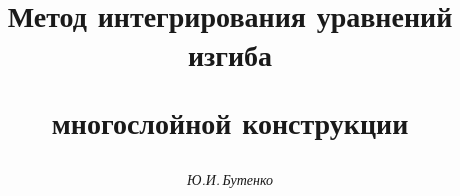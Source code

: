 

 


% 


\newcommand{\const}{\operatorname{const}} 


\newcommand{\tts}[1]{}  


 


 




\setcounter{page}{9} 












 


\author{\it Ю.И.\,Бутенко} 




\title{Метод интегрирования уравнений изгиба  


многослойной конструкции} 


 


\date{} 




\pagestyle{plain} %


 




\maketitle 


\label{begin} 


 


